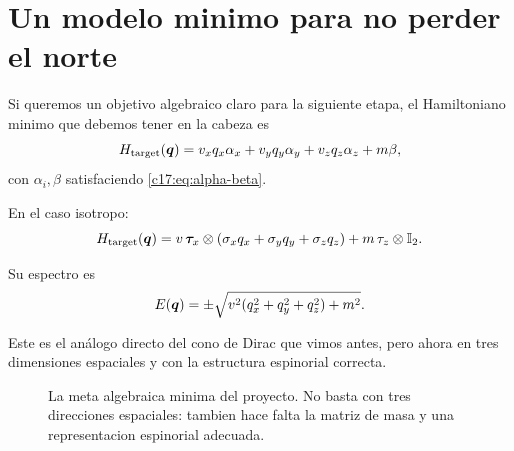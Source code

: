\section{Un modelo minimo para no perder el norte}

Si queremos un objetivo algebraico claro para la siguiente etapa, el Hamiltoniano minimo que debemos tener en la cabeza es
\begin{equation}
H_{\mathrm{target}}(\bm{q})
=
v_x q_x \alpha_x + v_y q_y \alpha_y + v_z q_z \alpha_z + m\beta,
\label{c17:eq:target}
\end{equation}
con \(\alpha_i,\beta\) satisfaciendo \eqref{c17:eq:alpha-beta}.

En el caso isotropo:
\begin{equation}
H_{\mathrm{target}}(\bm{q})
=
v\,\bm{\tau}_x\otimes(\sigma_x q_x + \sigma_y q_y + \sigma_z q_z)
 + m\,\tau_z\otimes \mathbb{I}_2.
\label{c17:eq:target-iso}
\end{equation}

Su espectro es
\begin{equation}
E(\bm{q})=\pm \sqrt{v^2(q_x^2+q_y^2+q_z^2)+m^2}.
\label{c17:eq:dispersion31}
\end{equation}

Este es el análogo directo del cono de Dirac que vimos antes, pero ahora en tres dimensiones espaciales y con la estructura espinorial correcta.

\begin{figure}[ht]
\centering
{}
\caption{La meta algebraica minima del proyecto. No basta con tres direcciones espaciales: tambien hace falta la matriz de masa y una representacion espinorial adecuada.}
\label{c17:fig:target}
\end{figure}

